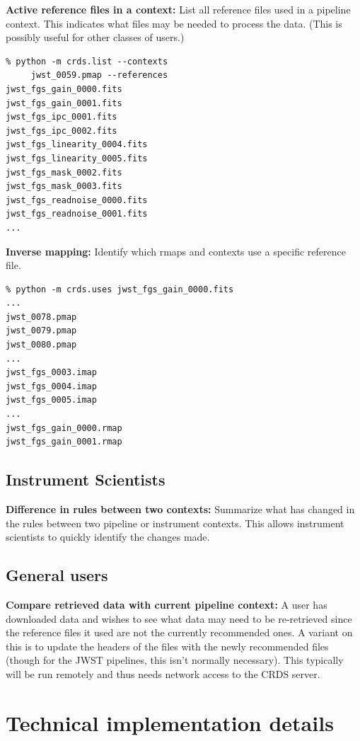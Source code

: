 \documentclass[final,authoryear,5p,times,twocolumn]{elsarticle}
\begin{document}
\textbf{Active reference files in a context:} List all reference files used in a
pipeline context. This indicates what files may be needed to process the
data. (This is possibly useful for other classes of users.)

\begin{verbatim}
% python -m crds.list --contexts 
     jwst_0059.pmap --references
jwst_fgs_gain_0000.fits
jwst_fgs_gain_0001.fits
jwst_fgs_ipc_0001.fits
jwst_fgs_ipc_0002.fits
jwst_fgs_linearity_0004.fits
jwst_fgs_linearity_0005.fits
jwst_fgs_mask_0002.fits
jwst_fgs_mask_0003.fits
jwst_fgs_readnoise_0000.fits
jwst_fgs_readnoise_0001.fits
...
\end{verbatim}

\textbf{Inverse mapping:} Identify which rmaps and contexts
use a specific reference file.

\begin{verbatim}
% python -m crds.uses jwst_fgs_gain_0000.fits
...
jwst_0078.pmap
jwst_0079.pmap
jwst_0080.pmap
...
jwst_fgs_0003.imap
jwst_fgs_0004.imap
jwst_fgs_0005.imap
...
jwst_fgs_gain_0000.rmap
jwst_fgs_gain_0001.rmap
\end{verbatim}

\subsection{Instrument Scientists}

\textbf{Difference in rules between two contexts:} Summarize what has changed in the
rules between two pipeline or instrument contexts. This allows instrument
scientists to quickly identify the changes made.

\subsection{General users}

\textbf{Compare retrieved data with current pipeline context:} A user has downloaded
data and wishes to see what data may need to be re-retrieved since the
reference files it used are not the currently recommended ones. A variant on
this is to update the headers of the files with the newly recommended files
(though for the JWST pipelines, this isn't normally necessary). This typically
will be run remotely and thus needs network access to the CRDS server.

\section{Technical implementation details}
\end{document}
